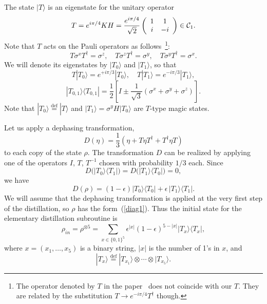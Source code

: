 \documentclass[pra,twocolumn,showpacs]{revtex4}
\newcommand{\la}{\langle}
\newcommand{\ra}{\rangle}
\newcommand*{\Cl}[1]{{\cal C}_{#1}}
\newcommand{\bydef}{\stackrel{\mathrm{def}}{=}}
\newcommand{\sx}{\sigma^x}
\newcommand{\sy}{\sigma^y}
\newcommand{\sz}{\sigma^z}
\newcommand{\ba}{\begin{array}}
\newcommand{\ea}{\end{array}}
\newcommand{\Tt}{$T$}
\begin{document}
The state $|T\ra$ is an eigenstate for the unitary operator
\begin{equation}
\label{T-op}
T = e^{i\pi/4} K H = \frac{e^{i\pi/4} }{\sqrt{2}}
\left( \ba{cc} 1 & 1 \\ i & -i \\ \ea \right) \in \Cl{1}.
\end{equation}
Note that $T$ acts on the Pauli operators as follows~\footnote{The
operator denoted by $T$ in the paper~\cite{G97a} does not coincide
with our $T$. They are related by the substitution $T\to e^{-i\pi/4}T^\dag$
though.}:
\begin{equation}\label{T-action}
T\sx T^\dag = \sz,\quad T\sz T^\dag = \sy, \quad 
T\sy T^\dag =\sx.
\end{equation}
We will denote its eigenstates by $|T_0\ra$ and $|T_1\ra$, so that
\[
T|T_0\ra = e^{+ i\pi/3} |T_0\ra, \quad 
T|T_1\ra = e^{- i\pi/3} |T_1\ra,
\]
\[
|T_{0,1}\ra\la T_{0,1}| = \frac12  \left[ I \pm
\frac1{\sqrt{3}} (\sx + \sy + \sz) \right].
\]
Note that $|T_0\ra\bydef |T\ra$ and $|T_1\ra=\sy H |T_0\ra$ are
\Tt-type magic states. 

Let us apply a dephasing transformation, 
\begin{equation}
\label{diag}
D(\eta)=\frac13 (\eta + T\eta T^\dag + T^\dag \eta T)
\end{equation}
to each copy of the state $\rho$. The transformation $D$ can be realized by
applying one of the operators $I$, $T$, $T^{-1}$ chosen with probability $1/3$
each.  Since
\[
D\bigl(|T_0\ra\la T_1|\bigr)=D\bigl(|T_1\ra\la T_0|\bigr)=0,
\]
we have
\begin{equation}
\label{diag1}
D(\rho)=(1-\epsilon)|T_0\ra \la T_0| + \epsilon \,|T_1\ra \la T_1|.
\end{equation}
We will assume that the dephasing transformation is applied at the
very first step of the distillation, so $\rho$ has the form~(\ref{diag1}).
Thus the initial state for the elementary distillation subroutine is
\begin{equation}\label{rho_in}
\rho_{in}=\rho^{\otimes 5}=
\sum_{x\in \{0,1\}^5}\! \epsilon^{|x|} (1-\epsilon)^{5-|x|} |T_x\ra\la T_x|,
\end{equation}
where $x=(x_1,\ldots,x_5)$ is a binary string, $|x|$ is the number of 1's in
$x$, and
\[
|T_x\ra\bydef |T_{x_1}\ra\otimes\cdots\otimes |T_{x_5}\ra.
\]
\end{document}
